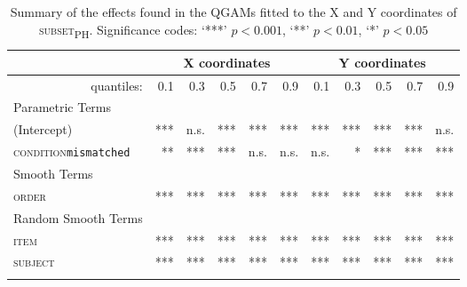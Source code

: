 \begin{table}[H]\fontsize{9}{10}
\caption{Summary of the effects found in the QGAMs fitted to the X and Y coordinates of \textsc{subset\textsubscript{PH}}. Significance codes: `***' $p < 0.001$, `**' $p < 0.01$, `*' $p < 0.05$}
\label{tab:8.9}
\centering
\begin{tabular}{lrrrrrrrrrr}
\lsptoprule
~                   & \multicolumn{5}{c}{X coordinates}                              & \multicolumn{5}{c}{Y coordinates}                               \\
\midrule
\multicolumn{1}{r}{quantiles:}          & 0.1        & 0.3        & 0.5        & 0.7        & 0.9        & 0.1        & 0.3        & 0.5        & 0.7        & 0.9         \\
\midrule
Parametric Terms    & \textbf{~} & \textbf{~} & \textbf{~} & \textbf{~} & \textbf{~} & \textbf{~} & \textbf{~} & \textbf{~} & \textbf{~} & \textbf{~}  \\
\midrule
(Intercept)         & ***        & n.s.         & ***        & ***        & ***        & ***        & ***        & ***        & ***        & n.s.          \\
\textsc{condition}\texttt{mismatched} & **       & ***          & ***        & n.s.        & n.s.        & n.s.       & *        & ***        & ***        & ***         \\
\midrule
Smooth Terms        & \textbf{~} & \textbf{~} & \textbf{~} & \textbf{~} & \textbf{~} & \textbf{~} & \textbf{~} & \textbf{~} & \textbf{~} & \textbf{~}  \\
\midrule
\textsc{order}               & ***        & ***        & ***        & ***        & ***        & ***        & ***        & ***        & ***        & ***         \\
\midrule
Random Smooth Terms & \textbf{~} & \textbf{~} & \textbf{~} & \textbf{~} & \textbf{~} & \textbf{~} & \textbf{~} & \textbf{~} & \textbf{~} & \textbf{~}  \\
\midrule
\textsc{item}                & ***        & ***        & ***        & ***        & ***        & ***        & ***        & ***        & ***        & ***         \\
\textsc{subject}             & ***        & ***        & ***        & ***        & ***        & ***        & ***        & ***        & ***        & ***        \\
\lspbottomrule
\end{tabular}
\end{table}






